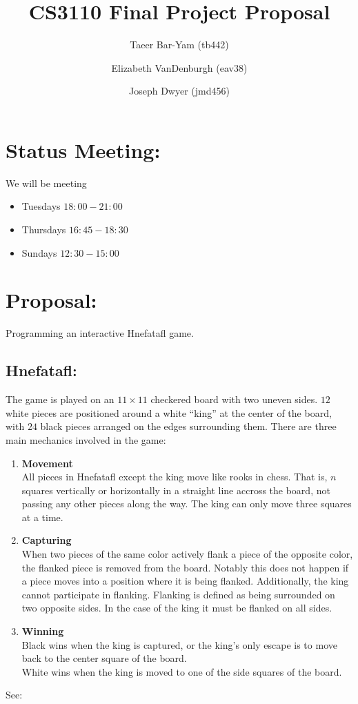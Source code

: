 \documentclass[11pt, oneside]{article}
\title{CS3110 Final Project Proposal}
\author{Taeer Bar-Yam (tb442) \and Elizabeth VanDenburgh (eav38) \and Joseph
  Dwyer (jmd456)}
\begin{document}
\maketitle

\section{Status Meeting:}
We will be meeting
\begin{itemize}
\item Tuesdays $18:00-21:00$
\item Thursdays $16:45-18:30$
\item Sundays $12:30-15:00$
\end{itemize}

\section{Proposal:}
Programming an interactive Hnefatafl game.
\subsection{Hnefatafl:}
The game is played on an $11\times 11$ checkered board with two uneven sides.
$12$ white pieces are positioned around a white ``king'' at the center of the
board, with $24$ black pieces arranged on the edges surrounding them.
There are three main mechanics involved in the game: 
\begin{enumerate}
\item \textbf{Movement}\\
  All pieces in Hnefatafl except the king move like rooks in chess. That is, $n$
  squares vertically or horizontally in a straight line accross the board, not
  passing any other pieces along the way. The king can only move three squares
  at a time.
\item \textbf{Capturing}\\
  When two pieces of the same color actively flank a piece of the opposite
  color, the flanked piece is removed from the board. Notably this does not
  happen if a piece moves into a position where it is being flanked.
  Additionally, the king cannot participate in flanking. Flanking is defined as
  being surrounded on two opposite sides. In the case of the king it must be
  flanked on all sides.
\item \textbf{Winning}\\
  Black wins when the king is captured, or the king's only escape is to move
  back to the center square of the board.\\
  White wins when the king is moved to one of the side squares of the board.
\end{enumerate}
See: %
\end{document}
